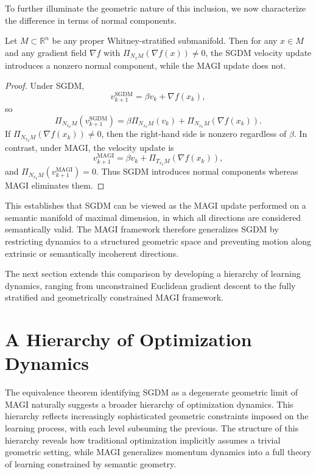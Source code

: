 \documentclass[12pt]{article}
\begin{document}
To further illuminate the geometric nature of this inclusion, we now characterize the difference in terms of normal components.

\begin{proposition}
Let $M \subset \mathbb{R}^n$ be any proper Whitney-stratified submanifold. Then for any $x \in M$ and any gradient field $\nabla f$ with $\Pi_{N_xM}(\nabla f(x)) \neq 0$, the SGDM velocity update introduces a nonzero normal component, while the MAGI update does not.
\end{proposition}

\begin{proof}
Under SGDM,
\[
v_{k+1}^{\mathrm{SGDM}}
=
\beta v_k + \nabla f(x_k),
\]
so
\[
\Pi_{N_{x_k}M}(v_{k+1}^{\mathrm{SGDM}})
=
\beta\Pi_{N_{x_k}M}(v_k)
+
\Pi_{N_{x_k}M}(\nabla f(x_k)).
\]
If $\Pi_{N_{x_k}M}(\nabla f(x_k)) \neq 0$, then the right-hand side is nonzero regardless of $\beta$. In contrast, under MAGI, the velocity update is
\[
v_{k+1}^{\mathrm{MAGI}}
=
\beta v_k + \Pi_{T_{x_k}M}(\nabla f(x_k)),
\]
and $\Pi_{N_{x_k}M}(v_{k+1}^{\mathrm{MAGI}}) = 0$. Thus SGDM introduces normal components whereas MAGI eliminates them.
\end{proof}

This establishes that SGDM can be viewed as the MAGI update performed on a semantic manifold of maximal dimension, in which all directions are considered semantically valid. The MAGI framework therefore generalizes SGDM by restricting dynamics to a structured geometric space and preventing motion along extrinsic or semantically incoherent directions.

The next section extends this comparison by developing a hierarchy of learning dynamics, ranging from unconstrained Euclidean gradient descent to the fully stratified and geometrically constrained MAGI framework.

\section{A Hierarchy of Optimization Dynamics}

The equivalence theorem identifying SGDM as a degenerate geometric limit of MAGI naturally suggests a broader hierarchy of optimization dynamics. This hierarchy reflects increasingly sophisticated geometric constraints imposed on the learning process, with each level subsuming the previous. The structure of this hierarchy reveals how traditional optimization implicitly assumes a trivial geometric setting, while MAGI generalizes momentum dynamics into a full theory of learning constrained by semantic geometry.
\end{document}
